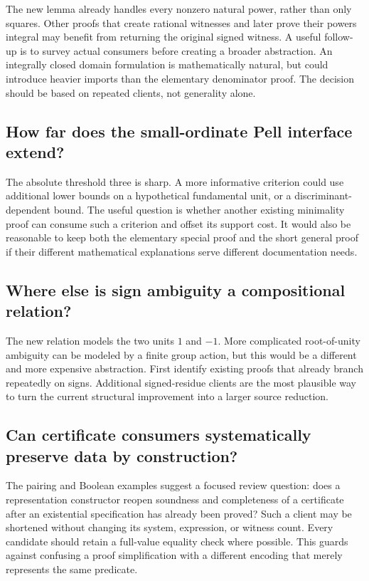 \documentclass[11pt,letterpaper]{article}
\begin{document}
The new lemma already handles every nonzero natural power, rather than only
squares. Other proofs that create rational witnesses and later prove their
powers integral may benefit from returning the original signed witness.
A useful follow-up is to survey actual consumers before creating a broader
abstraction. An integrally closed domain formulation is mathematically
natural, but could introduce heavier imports than the elementary denominator
proof. The decision should be based on repeated clients, not generality alone.

\subsection{How far does the small-ordinate Pell interface extend?}

The absolute threshold three is sharp. A more informative criterion could
use additional lower bounds on a hypothetical fundamental unit, or a
discriminant-dependent bound. The useful question is whether another
existing minimality proof can consume such a criterion and offset its support
cost. It would also be reasonable to keep both the elementary special proof
and the short general proof if their different mathematical explanations
serve different documentation needs.

\subsection{Where else is sign ambiguity a compositional relation?}

The new relation models the two units \(1\) and \(-1\). More complicated
root-of-unity ambiguity can be modeled by a finite group action, but this
would be a different and more expensive abstraction. First identify existing
proofs that already branch repeatedly on signs. Additional signed-residue
clients are the most plausible way to turn the current structural
improvement into a larger source reduction.

\subsection{Can certificate consumers systematically preserve data by construction?}

The pairing and Boolean examples suggest a focused review question:
does a representation constructor reopen soundness and completeness of a
certificate after an existential specification has already been proved?
Such a client may be shortened without changing its system, expression,
or witness count. Every candidate should retain a full-value equality check
where possible. This guards against confusing a proof simplification with a
different encoding that merely represents the same predicate.
\end{document}
